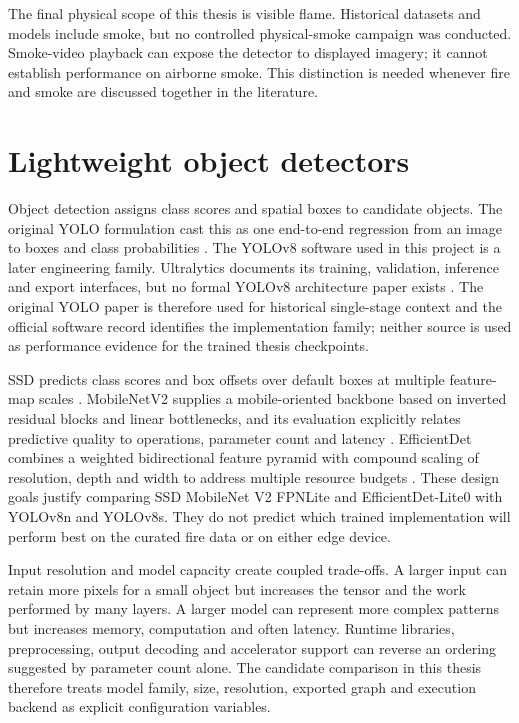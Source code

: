 The final physical scope of this thesis is visible flame. Historical datasets
and models include smoke, but no controlled physical-smoke campaign was
conducted. Smoke-video playback can expose the detector to displayed imagery;
it cannot establish performance on airborne smoke. This distinction is needed
whenever fire and smoke are discussed together in the literature.

\section{Lightweight object detectors}
\label{sec:background:detectors}

Object detection assigns class scores and spatial boxes to candidate objects.
The original YOLO formulation cast this as one end-to-end regression from an
image to boxes and class probabilities \cite{Redmon2016YOLO}. The YOLOv8
software used in this project is a later engineering family. Ultralytics
documents its training, validation, inference and export interfaces, but no
formal YOLOv8 architecture paper exists \cite{UltralyticsYOLOv8}. The original
YOLO paper is therefore used for historical single-stage context and the
official software record identifies the implementation family; neither source
is used as performance evidence for the trained thesis checkpoints.

SSD predicts class scores and box offsets over default boxes at multiple
feature-map scales \cite{Liu2016SSD}. MobileNetV2 supplies a mobile-oriented
backbone based on inverted residual blocks and linear bottlenecks, and its
evaluation explicitly relates predictive quality to operations, parameter
count and latency \cite{Sandler2018MobileNetV2}. EfficientDet combines a
weighted bidirectional feature pyramid with compound scaling of resolution,
depth and width to address multiple resource budgets
\cite{Tan2020EfficientDet}. These design goals justify comparing SSD MobileNet
V2 FPNLite and EfficientDet-Lite0 with YOLOv8n and YOLOv8s. They do not predict
which trained implementation will perform best on the curated fire data or on
either edge device.

Input resolution and model capacity create coupled trade-offs. A larger input
can retain more pixels for a small object but increases the tensor and the work
performed by many layers. A larger model can represent more complex patterns
but increases memory, computation and often latency. Runtime libraries,
preprocessing, output decoding and accelerator support can reverse an ordering
suggested by parameter count alone. The candidate comparison in this thesis
therefore treats model family, size, resolution, exported graph and execution
backend as explicit configuration variables.

